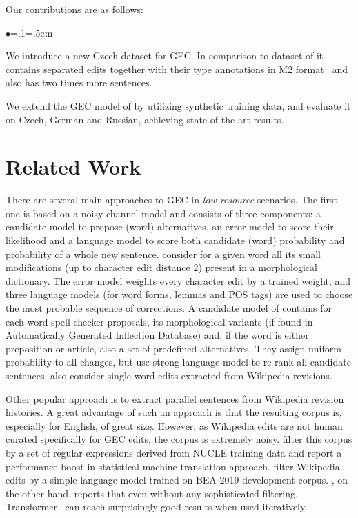 \documentclass[11pt,a4paper]{article}
\newenvironment{citemize}{\begin{list}{$\bullet$}{\topsep=.1\smallskipamount\itemsep=0pt\parsep=1pt\labelwidth=.5em}}{\end{list}}
\begin{document}
Our contributions are as follows:
\begin{citemize}
  \item We introduce a new Czech dataset for GEC. In comparison to dataset of  it contains separated edits together with their type annotations in M2 format~\cite{dahlmeier2012better} and also has two times more sentences.
  \item We extend the GEC model of  by utilizing synthetic training data, and evaluate it on Czech, German and Russian, achieving state-of-the-art results.
\end{citemize}



\section{Related Work}

There are several main approaches to GEC in \emph{low-resource} scenarios. The first one is based on a noisy channel model and consists of three components: a candidate model to propose (word) alternatives, an error model to score their likelihood and a language model to score both candidate (word) probability and probability of a whole new sentence.  consider for a given word all its small modifications (up to character edit distance 2) present in a morphological dictionary. The error model weights every character edit by a trained weight, and three language models (for word forms, lemmas and POS tags) are used to choose the most probable sequence of corrections. A candidate model of  contains for each word spell-checker proposals, its morphological variants (if found in Automatically Generated Inflection Database) and, if the word is either preposition or article, also a set of predefined alternatives. They assign uniform probability to all changes, but use strong language model to re-rank all candidate sentences.  also consider single word edits extracted from Wikipedia revisions.

Other popular approach is to extract parallel sentences from Wikipedia revision histories. A great advantage of such an approach is that the resulting corpus is, especially for English, of great size. However, as Wikipedia edits are not human curated specifically for GEC edits, the corpus is extremely noisy.  filter this corpus by a set of regular expressions derived from NUCLE training data and report a performance boost in statistical machine translation approach.  filter Wikipedia edits by a simple language model trained on BEA 2019 development corpus. , on the other hand, reports that even without any sophisticated filtering, Transformer~\cite{vaswani2017attention} can reach surprisingly good results when used iteratively.
\end{document}

